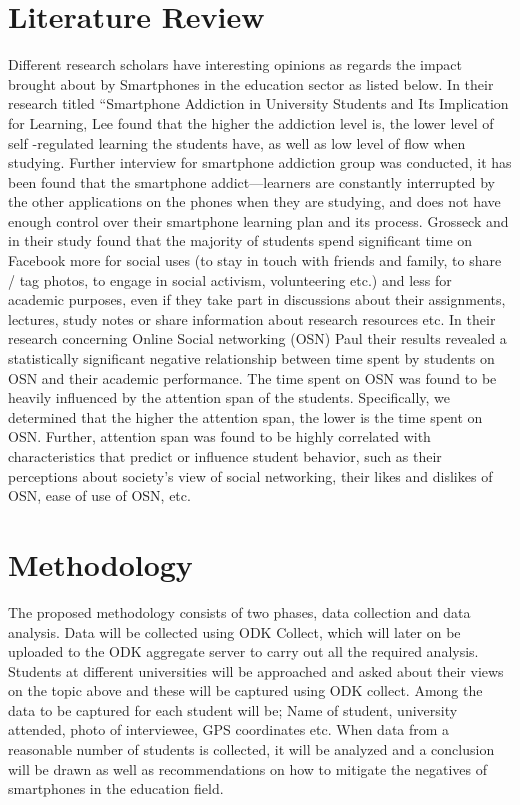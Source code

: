 \documentclass {article}
\begin{document}
\section{Literature Review}
Different  research scholars have interesting opinions as regards the impact brought about by Smartphones in the education sector as listed below.
In  their  research  titled  “Smartphone  Addiction  in University Students and Its Implication for Learning,  Lee  found  that  the  higher  the addiction  level  is,  the  lower  level  of  self -regulated learning the students have, as well as low level of flow when   studying.   Further   interview   for   smartphone addiction group was conducted, it has been found that the    smartphone    addict—learners    are    constantly interrupted  by  the  other  applications  on  the  phones when  they  are  studying,  and  does  not  have  enough control  over  their  smartphone  learning  plan  and  its process.
Grosseck and  in their study found that the  majority  of  students  spend  significant  time  on Facebook  more  for  social  uses  (to  stay  in  touch  with friends and family, to share / tag photos, to engage in social   activism,   volunteering   etc.)   and   less   for academic   purposes,   even   if   they   take   part   in discussions  about  their  assignments,  lectures,  study notes  or  share  information  about research  resources etc.
In    their    research    concerning    Online    Social networking   (OSN)   Paul   their   results 
revealed a statistically significant negative relationship between  time  spent  by  students  on  OSN  and  their academic  performance.  The  time  spent  on  OSN  was found to be heavily influenced by the attention span of the  students.  Specifically,  we  determined  that  the higher  the  attention  span,  the  lower  is  the  time  spent on  OSN.  Further,  attention  span  was  found  to  be highly  correlated  with  characteristics  that  predict  or influence  student  behavior,  such  as  their  perceptions about society’s view of social networking, their likes and dislikes of OSN, ease of use of OSN, etc.




\section{Methodology}
The proposed methodology consists of two phases, data collection and data analysis.
Data  will  be  collected  using  ODK  Collect,  which  will  later  on  be  uploaded  to  the  ODK
aggregate  server  to  carry  out  all  the  required  analysis. Students at different universities will be approached and asked about their views on the topic above and these will be captured using ODK collect.
Among the data to be captured for each student will be;
Name of student, university attended, photo of interviewee, GPS coordinates etc.
When data from a reasonable number of students is collected, it will be analyzed and a conclusion will be drawn as well as recommendations on how to mitigate the negatives of smartphones in the education field.



\nocite{*}


\end{document}
